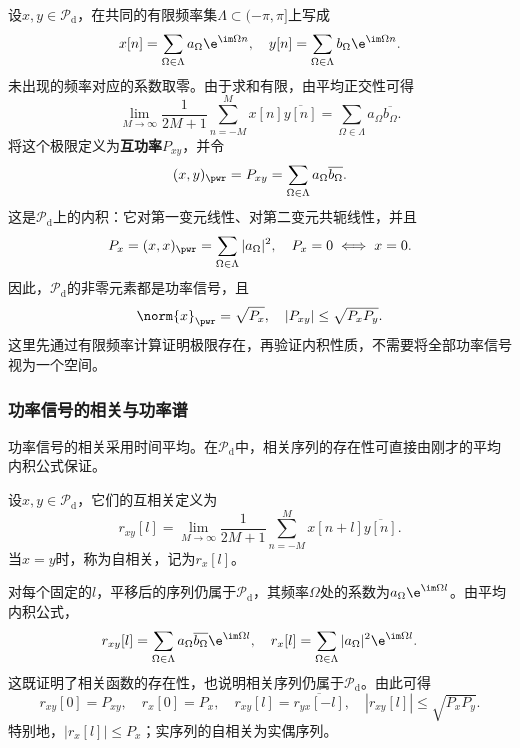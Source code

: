 设$x,y\in\mathcal{P}_{\mathrm d}$，在共同的有限频率集$\Lambda\subset(-\pi,\pi]$上写成
\begin{equation}
    x[n]=\sum_{\Omega\in\Lambda}a_\Omega\e^{\im\Omega n},\quad y[n]=\sum_{\Omega\in\Lambda}b_\Omega\e^{\im\Omega n}.
\end{equation}
未出现的频率对应的系数取零。由于求和有限，由平均正交性可得
\begin{equation}
    \lim_{M\to\infty}\frac{1}{2M+1}\sum_{n=-M}^{M}x[n]\overline{y[n]}=\sum_{\Omega\in\Lambda}a_\Omega\overline{b_\Omega}.
\end{equation}
将这个极限定义为\textbf{互功率}$P_{xy}$，并令
\begin{equation}
    (x,y)_{\pwr}=P_{xy}=\sum_{\Omega\in\Lambda}a_\Omega\overline{b_\Omega}.
\end{equation}
这是$\mathcal{P}_{\mathrm d}$上的内积：它对第一变元线性、对第二变元共轭线性，并且
\begin{equation}
    P_x=(x,x)_{\pwr}=\sum_{\Omega\in\Lambda}|a_\Omega|^2,\quad P_x=0\iff x=0.
\end{equation}
因此，$\mathcal{P}_{\mathrm d}$的非零元素都是功率信号，且
\begin{equation}
    \norm{x}_{\pwr}=\sqrt{P_x},\quad |P_{xy}|\leq\sqrt{P_xP_y}.
\end{equation}
这里先通过有限频率计算证明极限存在，再验证内积性质，不需要将全部功率信号视为一个空间。

\subsubsection{功率信号的相关与功率谱}

功率信号的相关采用时间平均。在$\mathcal{P}_{\mathrm d}$中，相关序列的存在性可直接由刚才的平均内积公式保证。

\begin{definition}[离散功率信号的相关]\label{def:discrete_correlation_power}
    设$x,y\in\mathcal{P}_{\mathrm d}$，它们的互相关定义为
    \begin{equation}
        r_{xy}[l]=\lim_{M\to\infty}\frac{1}{2M+1}\sum_{n=-M}^{M}x[n+l]\overline{y[n]}.
    \end{equation}
    当$x=y$时，称为自相关，记为$r_x[l]$。
\end{definition}

对每个固定的$l$，平移后的序列仍属于$\mathcal{P}_{\mathrm d}$，其频率$\Omega$处的系数为$a_\Omega\e^{\im\Omega l}$。由平均内积公式，
\begin{equation}
    r_{xy}[l]=\sum_{\Omega\in\Lambda}a_\Omega\overline{b_\Omega}\e^{\im\Omega l},\quad
    r_x[l]=\sum_{\Omega\in\Lambda}|a_\Omega|^2\e^{\im\Omega l}.
\end{equation}
这既证明了相关函数的存在性，也说明相关序列仍属于$\mathcal{P}_{\mathrm d}$。由此可得
\begin{equation}
    r_{xy}[0]=P_{xy},\quad r_x[0]=P_x,\quad
    r_{xy}[l]=\overline{r_{yx}[-l]},\quad
    |r_{xy}[l]|\leq\sqrt{P_xP_y}.
\end{equation}
特别地，$|r_x[l]|\leq P_x$；实序列的自相关为实偶序列。

